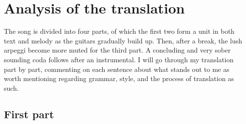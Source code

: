 \documentclass[12pt,paper=a4]{scrartcl}
\begin{document}
\begin{quote}


\end{quote}

\section{Analysis of the translation}

The song is divided into four parts, of which the first two form a unit in both
text and melody as the guitars gradually build up. Then, after a break, the
lush arpeggi become more muted for the third part. A concluding and very sober
sounding coda follows after an instrumental. I will go through my translation
part by part, commenting on each sentence about what stands out to me as worth
mentioning regarding grammar, style, and the process of translation as such.

\subsection{First part}
\end{document}
